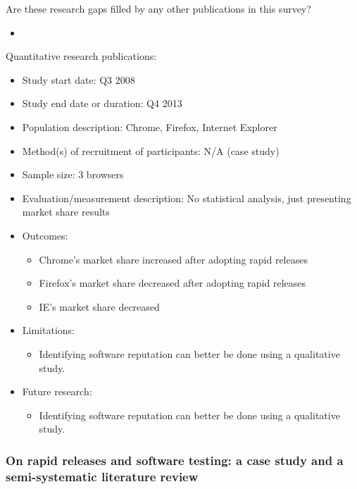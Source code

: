\documentclass[]{book}
\providecommand{\tightlist}{%
  \setlength{\itemsep}{0pt}\setlength{\parskip}{0pt}}
\begin{document}
Are these research gaps filled by any other publications in this survey?

\begin{itemize}
\item
\end{itemize}

Quantitative research publications:

\begin{itemize}
\tightlist
\item
  Study start date: Q3 2008
\item
  Study end date or duration: Q4 2013
\item
  Population description: Chrome, Firefox, Internet Explorer
\item
  Method(s) of recruitment of participants: N/A (case study)
\item
  Sample size: 3 browsers
\item
  Evaluation/measurement description: No statistical analysis, just
  presenting market share results
\item
  Outcomes:

  \begin{itemize}
  \tightlist
  \item
    Chrome's market share increased after adopting rapid releases
  \item
    Firefox's market share decreased after adopting rapid releases
  \item
    IE's market share decreased
  \end{itemize}
\item
  Limitations:

  \begin{itemize}
  \tightlist
  \item
    Identifying software reputation can better be done using a
    qualitative study.
  \end{itemize}
\item
  Future research:

  \begin{itemize}
  \tightlist
  \item
    Identifying software reputation can better be done using a
    qualitative study.
  \end{itemize}
\end{itemize}

\subsubsection{On rapid releases and software testing: a case study and
a semi-systematic literature
review}\label{on-rapid-releases-and-software-testing-a-case-study-and-a-semi-systematic-literature-review}
\end{document}
